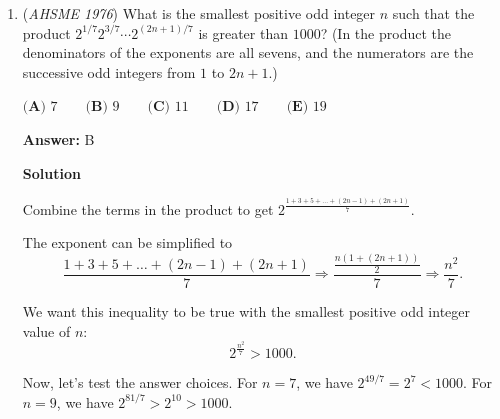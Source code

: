 \begin{enumerate}
 \textbf{Answer: }E



\textbf{Solution}

Because $\log_{m} n = \dfrac{\log n}{\log m}$, $4(\log_{a} x)^2+3(\log_{b} x)^2 =$ $\dfrac{4(\log x)^2}{(\log a)^2}+\dfrac{3(\log x)^2}{(\log b)^2} = \dfrac{(\log x)^2(4(\log a)^2+3(\log b)^2)}{(\log a \log b)^2}$.

 Therefore,

 
 \[\dfrac{(\log x)^2(4(\log a)^2+3(\log b)^2)}{(\log a \log b)^2} = \frac{8(\log x)^2}{\log a \log b}\]
 \[\dfrac{4(\log a)^2+3(\log b)^2}{\log a \log b} = 8\]

 \[\dfrac{4(\log a)^2}{\log a \log b} + \dfrac{3(\log b)^2}{\log a \log b} = 8\]

 \[4 \log_{b} a + 3 \log_{a} b = 8\]

 Now let $k = \log_{b} a$. Our equation becomes

 
 \[4k + \frac{3}{k} = 8\]
 \[4k^2 - 8k + 3 = 0\]
 \[k = \frac{8 \pm \sqrt{64-4(4)(3)}}{8}\]
 \[k = \frac{1}{2}, \frac{3}{2}\]

 Therefore, either $b = a^2$ or $b = \sqrt[3] {a^2}$. Since no option matches both of these solutions, the answer is $\boxed{\textbf{(E)}}$.

 - mako17

 


	\item (\textit{AHSME 1976}) What is the smallest positive odd integer $n$ such that the product $2^{1/7}2^{3/7}\cdots2^{(2n+1)/7}$ is greater than $1000$? 
(In the product the denominators of the exponents are all sevens, and the numerators are the successive odd integers from $1$ to $2n+1$.)


 $\textbf{(A) }7\qquad \textbf{(B) }9\qquad \textbf{(C) }11\qquad \textbf{(D) }17\qquad  \textbf{(E) }19$

 \textbf{Answer: }B



\textbf{Solution}

Combine the terms in the product to get $2^{\frac{1+3+5+ \dots +(2n-1)+(2n+1)}{7}}$.

 The exponent can be simplified to 
 \[\frac{1+3+5+ \dots +(2n-1)+(2n+1)}{7} \Rightarrow \frac{\frac{n(1+(2n+1))}{2}}{7} \Rightarrow \frac{n^2}{7}.\]

 We want this inequality to be true with the smallest positive odd integer value of $n$: 
 \[2^{\frac{n^2}{7}} > 1000.\]

 Now, let's test the answer choices. For $n=7$, we have $2^{49/7}=2^{7}<1000$. For $n=9$, we have $2^{81/7}>2^{10}>1000$.


\end{enumerate}
